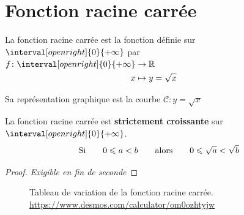 \documentclass[main.tex]{subfiles}
\begin{document}
\section{Fonction racine carrée}

\begin{definition}
	La fonction racine carrée est la fonction définie sur $\interval[open right]{0}{+\infty}$ par 		
	$\begin{aligned}[t]
			f \colon \interval[open right]{0}{+\infty}  & \rightarrow \mathbb{R}\\
			x & \mapsto y=\sqrt{x}
		\end{aligned}$   
	
	Sa représentation graphique est la courbe \og $\mathscr{C}  \colon y=\sqrt{x}$ \fg{}  
\end{definition}  
\begin{proposition}  
	La fonction racine carrée est \textbf{strictement croissante} sur $\interval[open right]{0}{+\infty}$.
	\setlength{\abovedisplayskip}{3pt}
	\setlength{\belowdisplayskip}{3pt}
	$$  		\textnormal{Si} \qquad  0 \leqslant a < b  \qquad 
	\textnormal{alors} \qquad 0 \leqslant\sqrt{a}<\sqrt{b}  $$
\end{proposition}
\begin{proof}\emph{Exigible en fin de seconde}\hfill 
	\vfill 
\end{proof}
\begin{figure}[h] 
	\caption{Tableau de variation de la fonction racine carrée. \url{https://www.desmos.com/calculator/om0ozhtyjw}}
\end{figure}  
\end{document}

